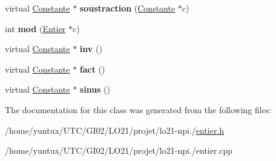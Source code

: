 \begin{DoxyCompactItemize}
\item 
\hypertarget{class_entier_a880936c128f077144cd266199cd27585}{virtual \hyperlink{class_constante}{\-Constante} $\ast$ {\bfseries soustraction} (\hyperlink{class_constante}{\-Constante} $\ast$c)}\label{class_entier_a880936c128f077144cd266199cd27585}

\item 
\hypertarget{class_entier_a29ebe7b4a2b8e8135736389977339330}{int {\bfseries mod} (\hyperlink{class_entier}{\-Entier} $\ast$c)}\label{class_entier_a29ebe7b4a2b8e8135736389977339330}

\item 
\hypertarget{class_entier_a5e4a3ab5cc280d0e082300207712d5d8}{virtual \hyperlink{class_constante}{\-Constante} $\ast$ {\bfseries inv} ()}\label{class_entier_a5e4a3ab5cc280d0e082300207712d5d8}

\item 
\hypertarget{class_entier_a094c16293e7853eafa646d1613db3034}{virtual \hyperlink{class_constante}{\-Constante} $\ast$ {\bfseries fact} ()}\label{class_entier_a094c16293e7853eafa646d1613db3034}

\item 
\hypertarget{class_entier_a081a93591a1095f0fe0715f14b5b4248}{virtual \hyperlink{class_constante}{\-Constante} $\ast$ {\bfseries sinus} ()}\label{class_entier_a081a93591a1095f0fe0715f14b5b4248}

\end{DoxyCompactItemize}


\-The documentation for this class was generated from the following files\-:\begin{DoxyCompactItemize}
\item 
/home/yuntux/\-U\-T\-C/\-G\-I02/\-L\-O21/projet/lo21-\/npi./\hyperlink{entier_8h}{entier.\-h}\item 
/home/yuntux/\-U\-T\-C/\-G\-I02/\-L\-O21/projet/lo21-\/npi./entier.\-cpp\end{DoxyCompactItemize}

